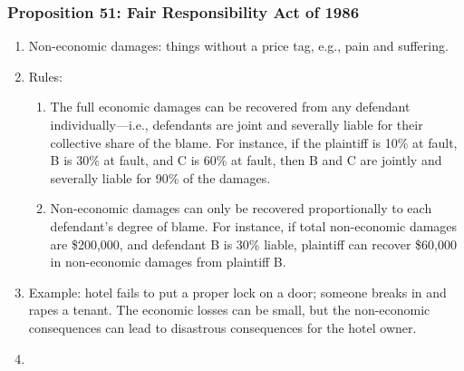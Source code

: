\subsubsection{Proposition 51: Fair Responsibility Act of 1986}

\begin{enumerate}
    \item Non-economic damages: things without a price tag, e.g., pain and suffering.
    \item Rules:
    \begin{enumerate}
        \item The full economic damages can be recovered from any defendant individually---i.e., defendants are joint and severally liable for their collective share of the blame. For instance, if the plaintiff is 10\% at fault, B is 30\% at fault, and C is 60\% at fault, then B and C are jointly and severally liable for 90\% of the damages.
        \item Non-economic damages can only be recovered proportionally to each defendant's degree of blame. For instance, if total non-economic damages are \$200,000, and defendant B is 30\% liable, plaintiff can recover \$60,000 in non-economic damages from plaintiff B.
    \end{enumerate}
    \item Example: hotel fails to put a proper lock on a door; someone breaks in and rapes a tenant. The economic losses can be small, but the non-economic consequences can lead to disastrous consequences for the hotel owner.
    \item 
\end{enumerate}


% 
% 
% 
% 
% 


